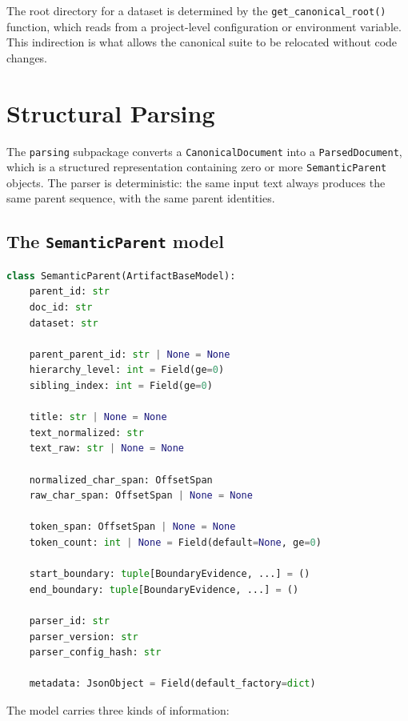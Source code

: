 \documentclass[11pt,a4paper]{article}
\begin{document}
The root directory for a dataset is determined by the
\texttt{get\_canonical\_root()} function, which reads from a
project-level configuration or environment variable. This indirection
is what allows the canonical suite to be relocated without code
changes.

\section{Structural Parsing}\label{sec:parsing}

The \texttt{parsing} subpackage converts a \texttt{CanonicalDocument}
into a \texttt{ParsedDocument}, which is a structured representation
containing zero or more \texttt{SemanticParent} objects. The parser
is deterministic: the same input text always produces the same parent
sequence, with the same parent identities.

\subsection{The \texttt{SemanticParent} model}
\begin{lstlisting}[language=python]
class SemanticParent(ArtifactBaseModel):
    parent_id: str
    doc_id: str
    dataset: str

    parent_parent_id: str | None = None
    hierarchy_level: int = Field(ge=0)
    sibling_index: int = Field(ge=0)

    title: str | None = None
    text_normalized: str
    text_raw: str | None = None

    normalized_char_span: OffsetSpan
    raw_char_span: OffsetSpan | None = None

    token_span: OffsetSpan | None = None
    token_count: int | None = Field(default=None, ge=0)

    start_boundary: tuple[BoundaryEvidence, ...] = ()
    end_boundary: tuple[BoundaryEvidence, ...] = ()

    parser_id: str
    parser_version: str
    parser_config_hash: str

    metadata: JsonObject = Field(default_factory=dict)
\end{lstlisting}

The model carries three kinds of information:
\end{document}
